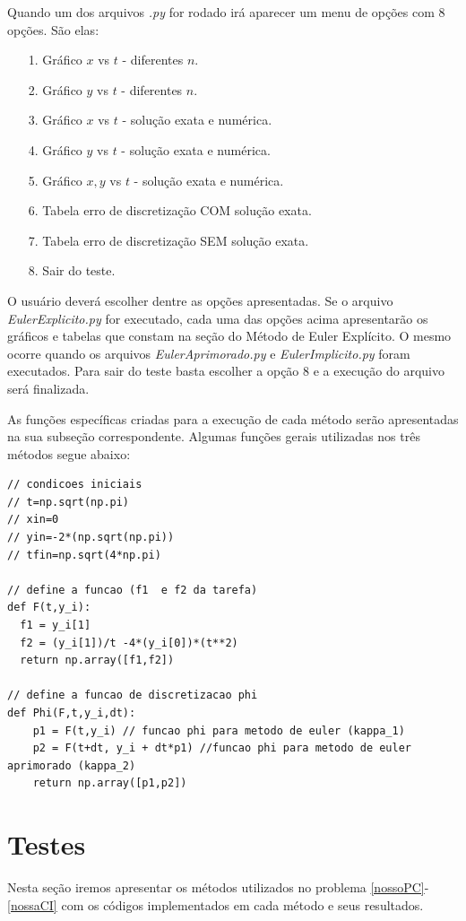 \documentclass[amsmath,amssymb,floatfix]{revtex4}
\begin{document}
Quando um dos arquivos \textit{.py} for rodado irá aparecer um menu de opções com 8 opções. São elas:
\begin{itemize}
\item[1.] Gráfico $x$ vs $t$ - diferentes $n$.
\item[2.] Gráfico $y$ vs $t$ - diferentes $n$.
\item[3.] Gráfico $x$ vs $t$ - solução exata e numérica.
\item[4.] Gráfico $y$ vs $t$ - solução exata e numérica.
\item[5.] Gráfico $x,y$ vs $t$ - solução exata e numérica.
\item[6.] Tabela erro de discretização COM solução exata.
\item[7.] Tabela erro de discretização SEM solução exata.
\item[8.] Sair do teste.
\end{itemize}

O usuário deverá escolher dentre as opções apresentadas. Se o arquivo \textit{EulerExplicito.py} for executado, cada uma das opções acima apresentarão os gráficos e tabelas que constam na seção do Método de Euler Explícito. O mesmo ocorre quando os arquivos \textit{EulerAprimorado.py} e \textit{EulerImplicito.py} foram executados. Para sair do teste basta escolher a opção $8$ e a execução do arquivo será finalizada.   

As funções específicas criadas para a execução de cada método serão apresentadas na sua subseção correspondente. Algumas funções gerais utilizadas nos três métodos segue abaixo:
\begin{lstlisting}
// condicoes iniciais
// t=np.sqrt(np.pi)
// xin=0
// yin=-2*(np.sqrt(np.pi))
// tfin=np.sqrt(4*np.pi)

// define a funcao (f1  e f2 da tarefa)
def F(t,y_i):
  f1 = y_i[1]
  f2 = (y_i[1])/t -4*(y_i[0])*(t**2)
  return np.array([f1,f2])

// define a funcao de discretizacao phi
def Phi(F,t,y_i,dt):
    p1 = F(t,y_i) // funcao phi para metodo de euler (kappa_1)
    p2 = F(t+dt, y_i + dt*p1) //funcao phi para metodo de euler aprimorado (kappa_2) 
    return np.array([p1,p2])
\end{lstlisting}
 
\section{Testes}
Nesta seção iremos apresentar os métodos utilizados no problema \eqref{nossoPC}-\eqref{nossaCI} com os códigos implementados em cada método e seus resultados. 
\end{document}
